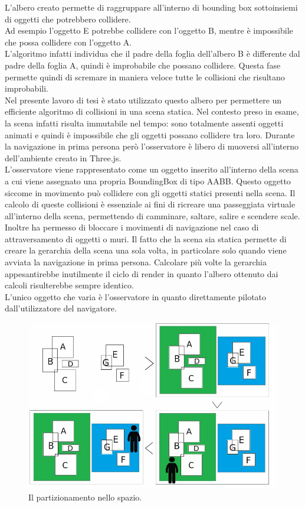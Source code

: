 L’albero creato permette di raggruppare all’interno di bounding box sottoinsiemi di oggetti che potrebbero collidere.
\\
Ad esempio l’oggetto E potrebbe collidere con l’oggetto B, mentre è impossibile che possa collidere con l’oggetto A.
\\
L’algoritmo infatti individua che il padre della foglia dell’albero B è differente dal padre della foglia A, quindi è improbabile che possano collidere.
Questa fase permette quindi di scremare in maniera veloce tutte le collisioni che risultano improbabili.
\\
Nel presente lavoro di tesi è stato utilizzato questo albero per permettere un efficiente algoritmo di collisioni in una scena statica.
Nel contesto preso in esame, la scena infatti risulta immutabile nel tempo: sono totalmente assenti oggetti animati e quindi è impossibile che gli oggetti possano collidere tra loro.
Durante la navigazione in prima persona però l’osservatore è libero di muoversi all’interno dell’ambiente creato in Three.js.
\\
L’osservatore viene rappresentato come un oggetto inserito all’interno della scena a cui viene assegnato una propria BoundingBox di tipo AABB. 
Questo oggetto siccome in movimento può collidere con gli oggetti statici presenti nella scena.
Il calcolo di queste collisioni è essenziale ai fini di ricreare una passeggiata virtuale all’interno della scena, permettendo di camminare, saltare, salire e scendere scale. 
\\
Inoltre ha permesso di bloccare i movimenti di navigazione nel caso di attraversamento di oggetti o muri.
Il fatto che la scena sia statica permette di creare la gerarchia della scena una sola volta, in particolare solo quando viene avviata la navigazione in prima persona.
Calcolare più volte la gerarchia appesantirebbe inutilmente il ciclo di render in quanto l’albero ottenuto dai calcoli risulterebbe sempre identico.
\\
L’unico oggetto che varia è l’osservatore in quanto direttamente pilotato dall’utilizzatore del navigatore.

\begin{figure}[htb]
 \centering
 \includegraphics[width=1\linewidth]{images/chapter_navigazione_scena/partiz_oss.jpg}\hfill
 \caption[Il partizionamento nello spazio.]{Il partizionamento nello spazio.}
 \label{fig:navigazione_scena_partiz_oss}
\end{figure}

